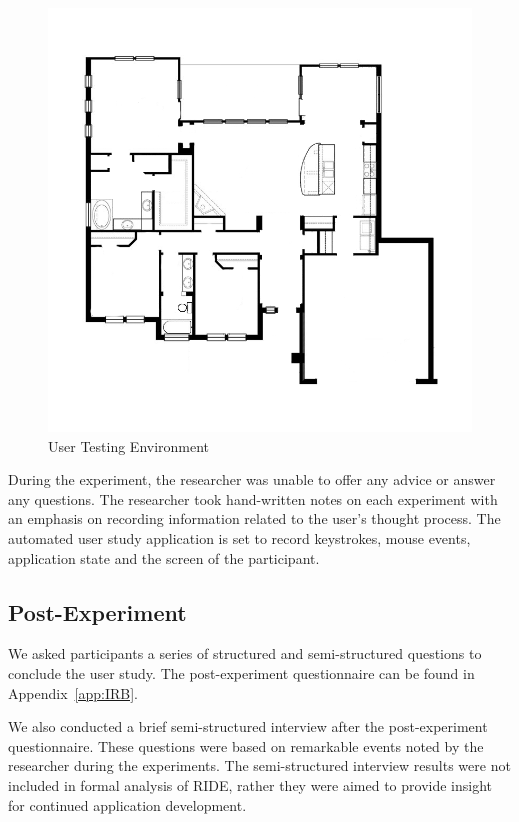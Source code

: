 \begin{figure}[ht]
\begin{center}
\includegraphics[width=5in]{images/generic-house.png}
\caption{User Testing Environment\label{fig:test-environment}}
\end{center}
\end{figure}

During the experiment, the researcher was unable to offer any advice or answer any questions. The researcher took hand-written notes on each experiment with an emphasis on recording information related to the user's thought process. The automated user study application is set to record keystrokes, mouse events, application state and the screen of the participant.


\subsection{Post-Experiment} %
\label{sub:post_experiment}
We asked participants a series of structured and semi-structured questions to conclude the user study. The post-experiment questionnaire can be found in Appendix~\ref{app:IRB}.

We also conducted a brief semi-structured interview after the post-experiment questionnaire. These questions were based on remarkable events noted by the researcher during the experiments. The semi-structured interview results were not included in formal analysis of RIDE, rather they were aimed to provide insight for continued application development.

